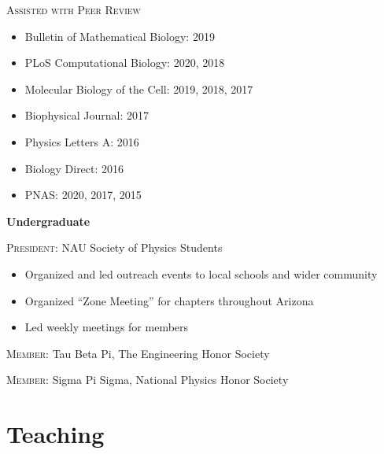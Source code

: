 \documentclass[letterpaper,10pt]{article} %
\begin{document}
\textsc{Assisted with Peer Review}
\begin{itemize}
\item Bulletin of Mathematical Biology: 2019
\item PLoS Computational Biology: 2020, 2018
\item Molecular Biology of the Cell: 2019, 2018, 2017
\item Biophysical Journal: 2017
\item Physics Letters A: 2016
\item Biology Direct: 2016
\item PNAS: 2020, 2017, 2015
\end{itemize}

\bigskip

{\large \textbf{Undergraduate}}

\textsc{President:} NAU Society of Physics Students
\begin{itemize}
\item Organized and led outreach events to local schools and wider community
\item Organized ``Zone Meeting'' for chapters throughout Arizona
\item Led weekly meetings for members
\end{itemize}

\textsc{Member:} Tau Beta Pi, The Engineering Honor Society

\textsc{Member:} Sigma Pi Sigma, National Physics Honor Society

\bigskip
\section*{Teaching}
\bigskip
\end{document}
